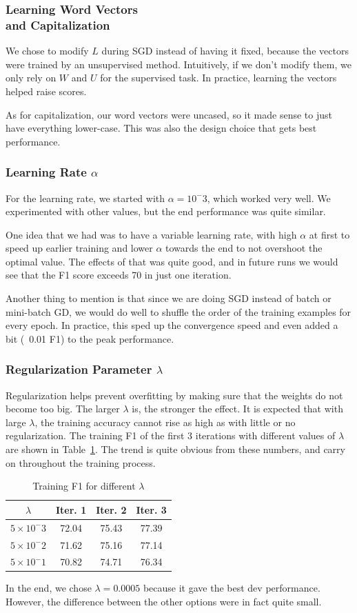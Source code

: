 \documentclass[12pt, twocolumn]{article}
\begin{document}
\subsubsection{Learning Word Vectors\\ and Capitalization}
We chose to modify $L$ during SGD instead of having it fixed, because the vectors were trained by an unsupervised method. Intuitively, if we don't modify them, we only rely on $W$ and $U$ for the supervised task. In practice, learning the vectors helped raise scores.

As for capitalization, our word vectors were uncased, so it made sense to just have everything lower-case. This was also the design choice that gets best performance.
\subsubsection{Learning Rate $\alpha$}
For the learning rate, we started with $\alpha = 10^-3$, which worked very well. We experimented with other values, but the end performance was quite similar.

One idea that we had was to have a variable learning rate, with high $\alpha$ at first to speed up earlier training and lower $\alpha$ towards the end to not overshoot the optimal value. The effects of that was quite good, and in future runs we would see that the F1 score exceeds 70 in just one iteration.

Another thing to mention is that since we are doing SGD instead of batch or mini-batch GD, we would do well to shuffle the order of the training examples for every epoch. In practice, this sped up the convergence speed and even added a bit (~0.01 F1) to the peak performance.
\subsubsection{Regularization Parameter $\lambda$}
Regularization helps prevent overfitting by making sure that the weights do not become too big. The larger $\lambda$ is, the stronger the effect. It is expected that with large $\lambda$, the training accuracy cannot rise as high as with little or no regularization. The training F1 of the first 3 iterations with different values of $\lambda$ are shown in Table~\ref{tab:lambda}. The trend is quite obvious from these numbers, and carry on throughout the training process.
\begin{table}[H]
\centering
	\begin{tabular}{|c|c|c|c|}
		\hline
		$\lambda$ & Iter. 1 & Iter. 2 & Iter. 3 \\\hline
		$5\times10^-3$ & 72.04 & 75.43 & 77.39 \\\hline
		$5\times10^-2$ & 71.62 & 75.16 & 77.14 \\\hline
		$5\times10^-1$ & 70.82 & 74.71 & 76.34 \\\hline
	\end{tabular}
	\caption{Training F1 for different $\lambda$}
\label{tab:lambda}
\end{table}
In the end, we chose $\lambda = 0.0005$ because it gave the best dev performance. However, the difference between the other options were in fact quite small.
\end{document}
